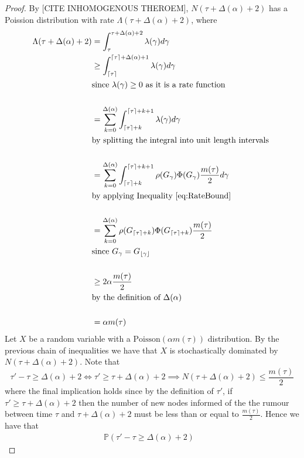 \begin{proof}
	By [CITE INHOMOGENOUS THEROEM], $N(\tau + \Delta(\alpha) + 2)$ has a Poission distribution with rate $\Lambda(\tau + \Delta(\alpha) + 2)$, where
	\begin{align*}
		\Lambda(\tau + \Delta(\alpha) + 2) &= \int_\tau^{\tau + \Delta(\alpha) + 2} \lambda(\gamma) d\gamma \\
		& \geq \int_{\lceil\tau\rceil}^{{\lceil\tau\rceil} + \Delta(\alpha) + 1} \lambda(\gamma) d\gamma \\
		& \text{since } \lambda(\gamma) \geq 0 \text{ as it is a rate function}\\
		& \\
		& = \sum_{k=0}^{\Delta(\alpha)} \int_{\lceil\tau\rceil + k}^{{\lceil\tau\rceil} + k + 1} \lambda(\gamma) d\gamma \\
		& \text{by splitting the integral into unit length intervals } \\
		& \\
		& = \sum_{k=0}^{\Delta(\alpha)} \int_{\lceil\tau\rceil + k}^{{\lceil\tau\rceil} + k + 1} \rho(G_\gamma)\Phi(G_\gamma)\frac{m(\tau)}{2} d\gamma \\
		& \text{by applying Inequality } \ref{eq:RateBound} \\
		& \\
		& = \sum_{k=0}^{\Delta(\alpha)} \rho(G_{\lceil\tau\rceil + k})\Phi(G_{\lceil\tau\rceil + k})\frac{m(\tau)}{2} \\
		& \text{since } G_\gamma = G_{\lfloor\gamma\rfloor} \\
		& \\
		& \geq 2\alpha\frac{m(\tau)}{2} \\
		& \text{by the definition of } \Delta(\alpha) \\
		& \\
		& = \alpha m(\tau)
	\end{align*}
	Let $X$ be a random variable with a $\text{Poisson}(\alpha m(\tau))$ distribution. 
	By the previous chain of inequalities we have that $X$ is stochastically dominated by $N(\tau + \Delta(\alpha) + 2)$. %
	Note that
	$$
		\tau' - \tau \geq \Delta(\alpha) + 2 \iff 
		\tau' \geq \tau + \Delta(\alpha) + 2 \implies 
		N(\tau + \Delta(\alpha) + 2) \leq \frac{m(\tau)}{2}
	$$
	where the final implication holds since by the definition of $\tau'$, if $\tau' \geq \tau + \Delta(\alpha) + 2$ then the number of new nodes informed of the the rumour between time $\tau$ and $\tau + \Delta(\alpha) + 2$ must be less than or equal to $\frac{m(\tau)}{2}$. Hence we have that
	\begin{align*}
		\mathbb{P}(\tau' - \tau \geq \Delta(\alpha) + 2) & 

\end{align*}
\end{proof}
